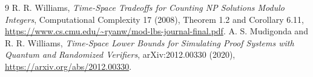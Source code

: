 \documentclass[11pt]{article}
\begin{document}
\begin{thebibliography}{9}
 R. R. Williams,
\emph{Time-Space Tradeoffs for Counting NP Solutions Modulo Integers},
Computational Complexity 17 (2008), Theorem 1.2 and Corollary 6.11,
\url{https://www.cs.cmu.edu/~ryanw/mod-lbs-journal-final.pdf}.
 A. S. Mudigonda and R. R. Williams,
\emph{Time-Space Lower Bounds for Simulating Proof Systems with Quantum and
Randomized Verifiers}, arXiv:2012.00330 (2020),
\url{https://arxiv.org/abs/2012.00330}.
\end{thebibliography}
\end{document}
